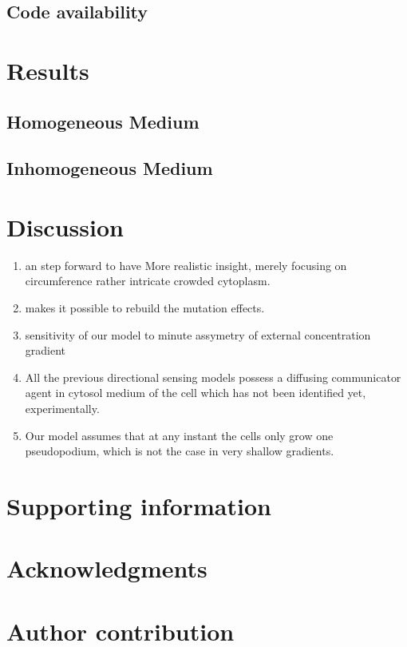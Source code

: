 \documentclass[10pt,letterpaper]{article}
\begin{document}
\subsection*{Code availability}

\section*{Results}
\subsection{Homogeneous Medium}
\subsection{Inhomogeneous Medium}

\section*{Discussion}
\begin{enumerate}

\item an step forward to have More realistic insight, merely focusing on circumference rather intricate crowded cytoplasm.
\item makes it possible to rebuild the mutation effects.
\item sensitivity of our model to minute assymetry of external concentration gradient
\item All the previous  directional sensing models possess a diffusing communicator agent in cytosol medium of the cell which has not been identified yet, experimentally.
\item Our model assumes that at any instant the cells only grow one pseudopodium, which is not the case in very shallow gradients.
\end{enumerate}



\section*{Supporting information}

\section*{Acknowledgments}

\section*{Author contribution}
\end{document}
